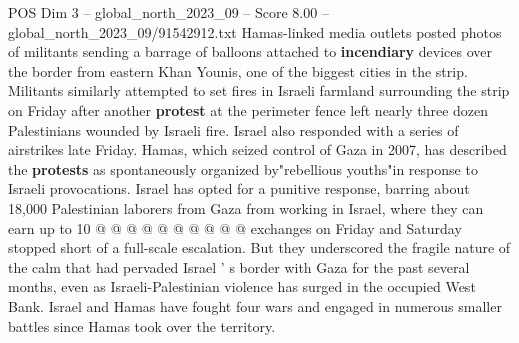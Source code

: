 \begin{textsample}{POS Dim 3 – global\_north\_2023\_09 – Score 8.00 – global\_north\_2023\_09/91542912.txt}
Hamas-linked media outlets posted photos of militants sending a barrage of balloons attached to \textbf{incendiary} devices over the border from eastern Khan Younis, one of the biggest cities in the strip.
Militants similarly attempted to set fires in Israeli farmland surrounding the strip on Friday after another \textbf{protest} at the perimeter fence left nearly three dozen Palestinians wounded by Israeli fire.
Israel also responded with a series of airstrikes late Friday.
Hamas, which seized control of Gaza in 2007, has described the \textbf{protests} as spontaneously organized by"rebellious youths"in response to Israeli provocations.
Israel has opted for a punitive response, barring about 18,000 Palestinian laborers from Gaza from working in Israel, where they can earn up to 10 @ @ @ @ @ @ @ @ @ @ exchanges on Friday and Saturday stopped short of a full-scale escalation.
But they underscored the fragile nature of the calm that had pervaded Israel ' s border with Gaza for the past several months, even as Israeli-Palestinian violence has surged in the occupied West Bank.
Israel and Hamas have fought four wars and engaged in numerous smaller battles since Hamas took over the territory.

\end{textsample}

